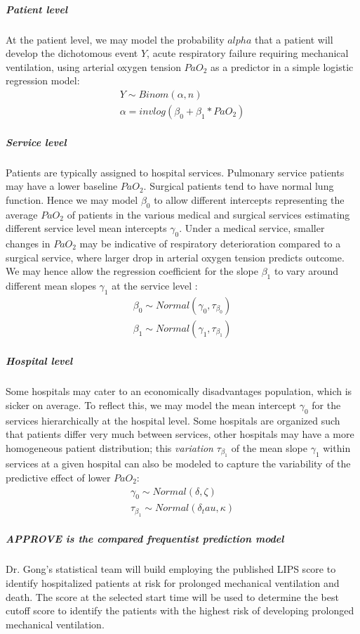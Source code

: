 \documentclass[11pt,notitlepage]{article}
\begin{document}
\subparagraph*{Patient level}
At the patient level, we may model the probability $alpha$ that a patient will develop the dichotomous event $Y$, acute respiratory failure requiring mechanical ventilation, using arterial oxygen tension $PaO_{2}$ as a predictor in a simple logistic regression model: 
\begin{align}
Y \sim Binom (\alpha, n) \\
\alpha = invlog (\beta_{0} +\beta_{1} * PaO_2)
\end{align}

\subparagraph*{Service  level}
Patients are typically assigned to hospital services. Pulmonary service patients may have a lower baseline $PaO_2$. Surgical patients tend to have normal lung function. Hence we may model $\beta_{0}$ to allow different intercepts representing the average $PaO_2$ of patients in the various medical and surgical services estimating different service level mean intercepts $\gamma_0$. Under a medical service, smaller changes in $PaO_2$ may be indicative of respiratory deterioration compared to a surgical service, where larger drop in arterial oxygen tension predicts outcome. We may hence allow the regression coefficient for the slope $\beta_{1}$ to vary around different mean slopes $\gamma_1$ at the service level : 
\begin{align}
 \beta_{0} \sim Normal (\gamma_0 , \tau_{\beta_0}) \\
 \beta_{1} \sim Normal (\gamma_1, \tau_{\beta_1})
\end{align}

\subparagraph*{Hospital level}
Some hospitals may cater to an economically disadvantages population, which is sicker on average. To reflect this, we may  model the mean intercept $\gamma_0$ for the services hierarchically at the hospital level. Some hospitals are organized such that patients differ very much between services, other hospitals may have a more homogeneous patient distribution; this \textit{variation} $\tau_{\beta_1}$ of the mean slope $\gamma_1$ within services at a given hospital can also be modeled to capture the variability of the predictive effect of lower $PaO_2$:
\begin{align}
\gamma_0 \sim Normal (\delta, \zeta) \\
\tau_{\beta_1} \sim Normal(\delta_tau, \kappa) 
\end{align}

\subparagraph*{APPROVE is the compared frequentist prediction model}
Dr. Gong's statistical team will build employing the published LIPS score \cite{Herridge_12594312} to identify hospitalized patients at risk for prolonged mechanical ventilation and death. The score at the selected start time will be used to determine the best cutoff score to identify the patients with the highest risk of developing prolonged mechanical ventilation.
\end{document}
